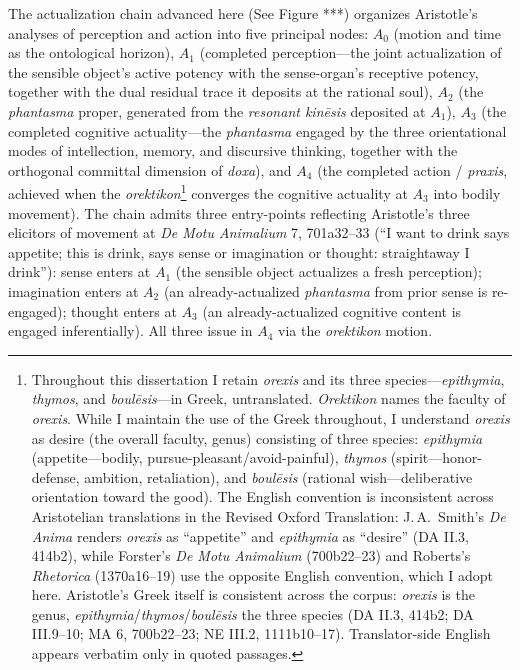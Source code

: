 \documentclass{article}
\begin{document}
The actualization chain advanced here (See Figure ***) organizes Aristotle's analyses of perception and action into five principal nodes: $A_0$ (motion and time as the ontological horizon), $A_1$ (completed perception---the joint actualization of the sensible object's active potency with the sense-organ's receptive potency, together with the dual residual trace it deposits at the rational soul), $A_2$ (the \textit{phantasma} proper, generated from the \textit{resonant kinēsis} deposited at $A_1$), $A_3$ (the completed cognitive actuality---the \textit{phantasma} engaged by the three orientational modes of intellection, memory, and discursive thinking, together with the orthogonal committal dimension of \textit{doxa}), and $A_4$ (the completed action / \textit{praxis}, achieved when the \textit{orektikon}\footnote{Throughout this dissertation I retain \textit{orexis} and its three species---\textit{epithymia}, \textit{thymos}, and \textit{boulēsis}---in Greek, untranslated. \textit{Orektikon} names the faculty of \textit{orexis}. While I maintain the use of the Greek throughout, I understand \textit{orexis} as desire (the overall faculty, genus) consisting of three species: \textit{epithymia} (appetite---bodily, pursue-pleasant/avoid-painful), \textit{thymos} (spirit---honor-defense, ambition, retaliation), and \textit{boulēsis} (rational wish---deliberative orientation toward the good). The English convention is inconsistent across Aristotelian translations in the Revised Oxford Translation: J.\,A.\ Smith's \textit{De Anima} renders \textit{orexis} as ``appetite'' and \textit{epithymia} as ``desire'' (DA II.3, 414b2), while Forster's \textit{De Motu Animalium} (700b22--23) and Roberts's \textit{Rhetorica} (1370a16--19) use the opposite English convention, which I adopt here. Aristotle's Greek itself is consistent across the corpus: \textit{orexis} is the genus, \textit{epithymia}/\textit{thymos}/\textit{boulēsis} the three species (DA II.3, 414b2; DA III.9--10; MA 6, 700b22--23; NE III.2, 1111b10--17). Translator-side English appears verbatim only in quoted passages.} converges the cognitive actuality at $A_3$ into bodily movement). The chain admits three entry-points reflecting Aristotle's three elicitors of movement at \textit{De Motu Animalium} 7, 701a32--33 (``I want to drink says appetite; this is drink, says sense or imagination or thought: straightaway I drink''): sense enters at $A_1$ (the sensible object actualizes a fresh perception); imagination enters at $A_2$ (an already-actualized \textit{phantasma} from prior sense is re-engaged); thought enters at $A_3$ (an already-actualized cognitive content is engaged inferentially). All three issue in $A_4$ via the \textit{orektikon} motion. 
\end{document}
